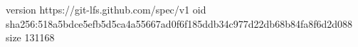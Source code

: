 version https://git-lfs.github.com/spec/v1
oid sha256:518a5bdce5efb5d5ca4a55667ad0f6f185ddb34c977d22db68b84fa8f6d2d088
size 131168
